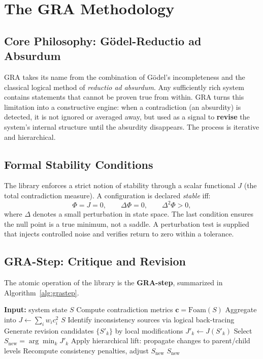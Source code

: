 \documentclass[11pt,a4paper]{article}
\begin{document}
\section{The GRA Methodology}
\subsection{Core Philosophy: Gödel-Reductio ad Absurdum}
GRA takes its name from the combination of Gödel’s incompleteness and the classical logical method of \textit{reductio ad absurdum}. Any sufficiently rich system contains statements that cannot be proven true from within. GRA turns this limitation into a constructive engine: when a contradiction (an absurdity) is detected, it is not ignored or averaged away, but used as a signal to \textbf{revise} the system’s internal structure until the absurdity disappears. The process is iterative and hierarchical.

\subsection{Formal Stability Conditions}
The library enforces a strict notion of stability through a scalar functional $J$ (the total contradiction measure). A configuration is declared \textit{stable} iff:
\begin{equation}
\Phi = J = 0, \qquad \Delta\Phi = 0, \qquad \Delta^2\Phi > 0,
\end{equation}
where $\Delta$ denotes a small perturbation in state space. The last condition ensures the null point is a true minimum, not a saddle. A perturbation test is supplied that injects controlled noise and verifies return to zero within a tolerance.

\subsection{GRA-Step: Critique and Revision}
The atomic operation of the library is the \textbf{GRA-step}, summarized in Algorithm~\ref{alg:grastep}.

\begin{algorithm}[tb]
\caption{GRA-Step (single iteration)}\label{alg:grastep}
\begin{algorithmic}[1]
\State \textbf{Input:} system state $S$
\State Compute contradiction metrics $\mathbf{c} = \text{Foam}(S)$
\State Aggregate into $J \leftarrow \sum_i w_i c_i^2$ 
    \State \Return $S$ 
\EndIf
\State Identify inconsistency sources via logical back-tracing
\State Generate revision candidates $\{S'_k\}$ by local modifications
    \State $J'_k \leftarrow J(S'_k)$
\EndFor
\State Select $S_{\text{new}} = \arg\min_k J'_k$
\State Apply hierarchical lift: propagate changes to parent/child levels
\State Recompute consistency penalties, adjust $S_{\text{new}}$
\State \Return $S_{\text{new}}$
\end{algorithmic}
\end{algorithm}
\end{document}
